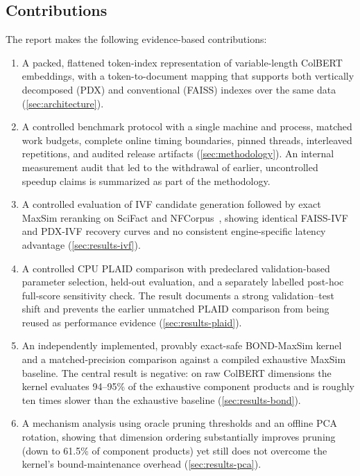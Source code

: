 \subsection{Contributions}

The report makes the following evidence-based contributions:

\begin{enumerate}[noitemsep]
  \item A packed, flattened token-index representation of variable-length
    ColBERT embeddings, with a token-to-document mapping that supports both
    vertically decomposed (PDX) and conventional (FAISS) indexes over the same
    data (\cref{sec:architecture}).
  \item A controlled benchmark protocol with a single machine and process,
    matched work budgets, complete online timing boundaries, pinned threads,
    interleaved repetitions, and audited release artifacts
    (\cref{sec:methodology}). An internal measurement audit that led to the
    withdrawal of earlier, uncontrolled speedup claims is summarized as part
    of the methodology.
  \item A controlled evaluation of IVF candidate generation followed by exact
    MaxSim reranking on SciFact and NFCorpus~\citep{thakur2021beir}, showing
    identical FAISS-IVF and PDX-IVF recovery curves and no consistent
    engine-specific latency advantage (\cref{sec:results-ivf}).
  \item A controlled CPU PLAID comparison with predeclared validation-based
    parameter selection, held-out evaluation, and a separately labelled
    post-hoc full-score sensitivity check. The result documents a strong
    validation--test shift and prevents the earlier unmatched PLAID comparison
    from being reused as performance evidence (\cref{sec:results-plaid}).
  \item An independently implemented, provably exact-safe BOND-MaxSim kernel
    and a matched-precision comparison against a compiled exhaustive MaxSim
    baseline. The central result is negative: on raw ColBERT dimensions the
    kernel evaluates 94--95\% of the exhaustive component products and is
    roughly ten times slower than the exhaustive baseline
    (\cref{sec:results-bond}).
  \item A mechanism analysis using oracle pruning thresholds and an offline
    PCA rotation, showing that dimension ordering substantially improves
    pruning (down to 61.5\% of component products) yet still does not
    overcome the kernel's bound-maintenance overhead
    (\cref{sec:results-pca}).
\end{enumerate}


